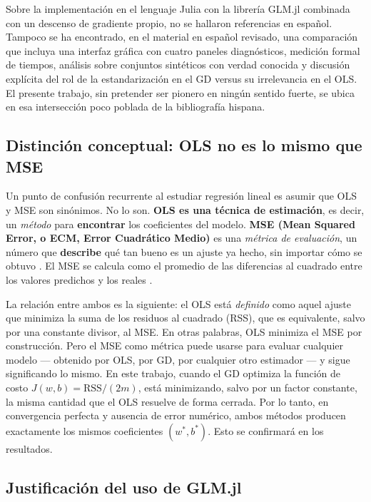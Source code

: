 \documentclass[11pt,a4paper]{article}
\begin{document}
Sobre la implementación en el lenguaje Julia con la librería GLM.jl combinada con un descenso de gradiente propio, no se hallaron referencias en español. Tampoco se ha encontrado, en el material en español revisado, una comparación que incluya una interfaz gráfica con cuatro paneles diagnósticos, medición formal de tiempos, análisis sobre conjuntos sintéticos con verdad conocida y discusión explícita del rol de la estandarización en el GD versus su irrelevancia en el OLS. El presente trabajo, sin pretender ser pionero en ningún sentido fuerte, se ubica en esa intersección poco poblada de la bibliografía hispana.

\subsection{Distinción conceptual: OLS no es lo mismo que MSE}

Un punto de confusión recurrente al estudiar regresión lineal es asumir que OLS y MSE son sinónimos. No lo son. \textbf{OLS es una técnica de estimación}, es decir, un \textit{método} para \textbf{encontrar} los coeficientes del modelo. \textbf{MSE (Mean Squared Error, o ECM, Error Cuadrático Medio)} es una \textit{métrica de evaluación}, un número que \textbf{describe} qué tan bueno es un ajuste ya hecho, sin importar cómo se obtuvo \cite{dialektico_metricas,datacamp_loss}. El MSE se calcula como el promedio de las diferencias al cuadrado entre los valores predichos y los reales \cite{ibm_loss,numxl_mse}.

La relación entre ambos es la siguiente: el OLS está \textit{definido} como aquel ajuste que minimiza la suma de los residuos al cuadrado (RSS), que es equivalente, salvo por una constante divisor, al MSE. En otras palabras, OLS minimiza el MSE por construcción. Pero el MSE como métrica puede usarse para evaluar cualquier modelo --- obtenido por OLS, por GD, por cualquier otro estimador --- y sigue significando lo mismo. En este trabajo, cuando el GD optimiza la función de costo $J(w,b) = \text{RSS}/(2m)$, está minimizando, salvo por un factor constante, la misma cantidad que el OLS resuelve de forma cerrada. Por lo tanto, en convergencia perfecta y ausencia de error numérico, ambos métodos producen exactamente los mismos coeficientes $(w^*, b^*)$. Esto se confirmará en los resultados.

\subsection{Justificación del uso de GLM.jl}
\end{document}
